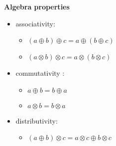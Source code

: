 \documentclass{book}
\begin{document}
\textbf{Algebra properties}\\
\begin{itemize}
\item associativity:
	\begin{itemize}
	\item $(a \oplus b) \oplus c = a \oplus (b \oplus c) $
	\item $(a\otimes b) \otimes c = a \otimes (b \otimes c)$
	\end{itemize}
\item commutativity :
	\begin{itemize}
	\item $a \oplus b = b \oplus a $
	\item $a \otimes b = b \otimes a $
	\end{itemize}
\item distributivity:
	\begin{itemize}
	\item  $(a \oplus b) \otimes c = a \otimes c \oplus b \otimes c $
	\end{itemize}
\end{itemize}
\end{document}
